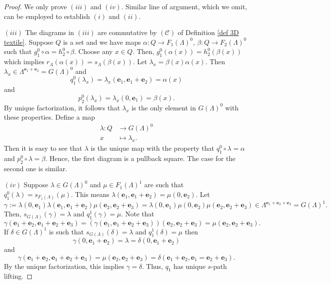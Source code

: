 \documentclass[a4paper,reqno,12pt]{amsart}
\newcommand{\ea}{\mathbf{e}_1}
\newcommand{\eb}{\mathbf{e}_2}
\newcommand{\ec}{\mathbf{e}_3}
\theoremstyle{definition}
\theoremstyle{remark}
\begin{document}
\begin{proof} We only prove $(iii)$ and $(iv)$. Similar line of argument, which we omit, can be employed to establish $(i)$ and $(ii)$. 

$(iii)$ The diagrams in $(iii)$ are commutative by $(\mathcal{C})$ of Definition \ref{def 3D textile}. Suppose $Q$ is a set and we have maps $\alpha:Q\longrightarrow F_1(\Lambda)^0$, $\beta:Q\longrightarrow F_2(\Lambda)^0$ such that $g_1^0 \circ \alpha=h_2^0 \circ \beta$. Choose any $x\in Q$. Then, $g_1^0(\alpha(x))=h_2^0(\beta(x))$ which implies $r_\Lambda(\alpha(x))=s_\Lambda(\beta(x))$. Let $\lambda_x=\beta(x)\alpha(x)$. Then $\lambda_x\in \Lambda^{\ea+\eb}=G(\Lambda)^0$ and \[q_1^0(\lambda_x)=\lambda_x(\ea,\ea+\eb)=\alpha(x)\] and \[p_2^0(\lambda_x)=\lambda_x(0,\ea)=\beta(x).\] By unique factorization, it follows that $\lambda_x$ is the only element in $G(\Lambda)^0$ with these properties. Define a map 
\begin{align*}
\lambda:Q &\longrightarrow G(\Lambda)^0\\
x &\longmapsto \lambda_x.
\end{align*}
Then it is easy to see that $\lambda$ is the unique map with the property that $q_1^0\circ \lambda=\alpha$ and $p_2^0\circ \lambda=\beta$. Hence, the first diagram is a pullback square. The case for the second one is similar.

$(iv)$ Suppose $\lambda\in G(\Lambda)^0$ and $\mu\in F_1(\Lambda)^1$ are such that $q_1^0(\lambda)=s_{F_1(\Lambda)}(\mu)$. This means $\lambda(\ea,\ea+\eb)=\mu(0,\eb)$. Let \[\gamma:=\lambda(0,\ea)\lambda(\ea,\ea+\eb)\mu(\eb,\eb+\ec)=\lambda(0,\ea)\mu(0,\eb)\mu(\eb,\eb+\ec)\in \Lambda^{\ea+\eb+\ec}=G(\Lambda)^1.\] Then, $s_{G(\Lambda)}(\gamma)=\lambda$ and $q_1^1(\gamma)=\mu$. Note that \[\gamma(\ea+\eb,\ea+\eb+\ec)=(\gamma(\ea,\ea+\eb+\ec))(\eb,\eb+\ec)=\mu(\eb,\eb+\ec).\] If $\delta\in G(\Lambda)^1$ is such that $s_{G(\Lambda)}(\delta)=\lambda$ and $q_1^1(\delta)=\mu$ then \[\gamma(0,\ea+\eb)=\lambda=\delta(0,\ea+\eb)\] and \[\gamma(\ea+\eb,\ea+\eb+\ec)=\mu(\eb,\eb+\ec)=\delta(\ea+\eb,\ea=\eb+\ec).\] By the unique factorization, this implies $\gamma=\delta$. Thus, $q_1$ has unique $s$-path lifting.
\end{proof}
\end{document}
